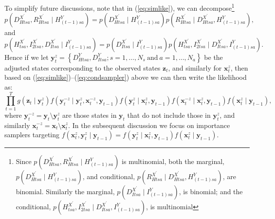 \documentclass[a4paper]{article}
\newcommand{\bx}{\bm{x}}
\newcommand{\by}{\bm{y}}
\newcommand{\bz}{\bm{z}}
\begin{document}
To simplify future discussions, note that in (\ref{eq:simlike}), we can decompose\footnote{Since $p\left(D^{X^\prime}_{Htsa}, R^{X^\prime}_{Htsa} \mid H^{Y}_{(t - 1)sa}\right)$ is multinomial, both the marginal, $p\left(D^{X^\prime}_{Htsa} \mid H^{Y}_{(t - 1)sa}\right)$, and conditional, $p\left(R^{X^\prime}_{Htsa} \mid D^{X^\prime}_{Htsa}, H^{Y}_{(t - 1)sa}\right)$, are binomial. Similarly the marginal, $p\left(D^{X^\prime}_{Itsa} \mid I^{Y}_{(t - 1)sa}\right)$, is binomial; and the conditional, $p\left(H^{X^\prime}_{tsa}, I^{X^\prime}_{2tsa} \mid D^{X^\prime}_{Itsa}, I^{Y}_{(t - 1)sa}\right)$, is multinomial}
\begin{equation}
    p\left(D^{X^\prime}_{Htsa}, R^{X^\prime}_{Htsa} \mid H^{Y}_{(t - 1)sa}\right) = p\left(D^{X^\prime}_{Htsa} \mid H^{Y}_{(t - 1)sa}\right)p\left(R^{X^\prime}_{Htsa} \mid D^{X^\prime}_{Htsa}, H^{Y}_{(t - 1)sa}\right),
\end{equation}
and
\begin{equation}
    p\left(H^{X^\prime}_{tsa}, I^{X^\prime}_{2tsa}, D^{X^\prime}_{Itsa} \mid I^{Y}_{(t - 1)sa}\right) = p\left(D^{X^\prime}_{Itsa} \mid I^{Y}_{(t - 1)sa}\right)p\left(H^{X^\prime}_{tsa}, I^{X^\prime}_{2tsa} \mid D^{X^\prime}_{Itsa}, I^{Y}_{(t - 1)sa}\right).\label{eq:condsampler}
\end{equation}
Hence if we let $\by^z_t = \left\{D^Y_{Htsa}, D^Y_{Itsa}; s = 1, \dots, N_s~\mbox{and}~a = 1,\dots, N_a\right\}$ be the adjusted states corresponding to the observed states $\bz_t$, and similarly for $\bx^z_t$, then based on (\ref{eq:simlike})--(\ref{eq:condsampler}) above we can then write the likelihood as:
\begin{equation}
    \prod_{t = 1}^T g\left(\bz_{t} \mid \by^z_t\right)f\left(\by^{-z}_{t} \mid \by^z_t, \bx^{-z}_{t}, \by_{t - 1}\right)f\left(\by^z_t \mid \bx^z_t, \by_{t - 1}\right)f\left(\bx^{-z}_t \mid \bx^z_t, \by_{t - 1}\right)f\left(\bx^z_t \mid \by_{t - 1}\right)\label{eq:conddecomp},
\end{equation}
where $\by^{-z}_t = \by_t \setminus \by^z_t$ are those states in $\by_t$ that do not include those in $\by^z_t$, and similarly $\bx^{-z}_t = \bx_t \setminus \bx^z_t$. In the subsequent discussion we focus on importance samplers targeting $f\left(\bx^z_t, \by^z_t \mid \by_{t - 1}\right) = f\left(\by^z_t \mid \bx^z_t, \by_{t - 1}\right)f\left(\bx^z_t \mid \by_{t - 1}\right)$.
\end{document}
